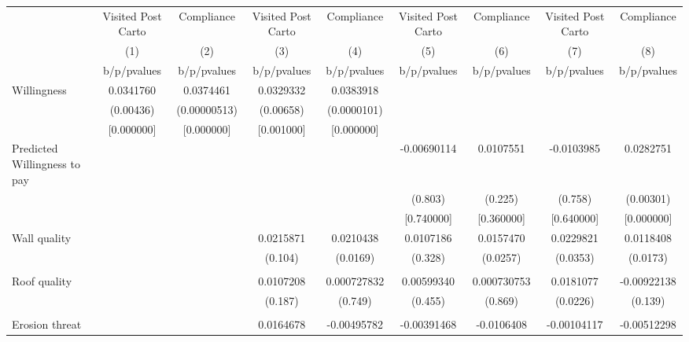 {
\def\sym#1{\ifmmode^{#1}\else\(^{#1}\)\fi}
\begin{tabular}{l*{8}{c}}
\toprule
                &\multicolumn{1}{c}{Visited Post Carto}&\multicolumn{1}{c}{Compliance}&\multicolumn{1}{c}{Visited Post Carto}&\multicolumn{1}{c}{Compliance}&\multicolumn{1}{c}{Visited Post Carto}&\multicolumn{1}{c}{Compliance}&\multicolumn{1}{c}{Visited Post Carto}&\multicolumn{1}{c}{Compliance}\\
                &\multicolumn{1}{c}{(1)}&\multicolumn{1}{c}{(2)}&\multicolumn{1}{c}{(3)}&\multicolumn{1}{c}{(4)}&\multicolumn{1}{c}{(5)}&\multicolumn{1}{c}{(6)}&\multicolumn{1}{c}{(7)}&\multicolumn{1}{c}{(8)}\\
                &b/p/pvalues&b/p/pvalues&b/p/pvalues&b/p/pvalues&b/p/pvalues&b/p/pvalues&b/p/pvalues&b/p/pvalues\\
\midrule
Willingness     &0.0341760&0.0374461&0.0329332&0.0383918&         &         &         &         \\
                &(0.00436)&(0.00000513)&(0.00658)&(0.0000101)&         &         &         &         \\
                &[0.000000]&[0.000000]&[0.001000]&[0.000000]&         &         &         &         \\
Predicted Willingness to pay&         &         &         &         &-0.00690114&0.0107551&-0.0103985&0.0282751\\
                &         &         &         &         &  (0.803)&  (0.225)&  (0.758)&(0.00301)\\
                &         &         &         &         &[0.740000]&[0.360000]&[0.640000]&[0.000000]\\
Wall quality    &         &         &0.0215871&0.0210438&0.0107186&0.0157470&0.0229821&0.0118408\\
                &         &         &  (0.104)& (0.0169)&  (0.328)& (0.0257)& (0.0353)& (0.0173)\\
                &         &         &         &         &         &         &         &         \\
Roof quality    &         &         &0.0107208&0.000727832&0.00599340&0.000730753&0.0181077&-0.00922138\\
                &         &         &  (0.187)&  (0.749)&  (0.455)&  (0.869)& (0.0226)&  (0.139)\\
                &         &         &         &         &         &         &         &         \\
Erosion threat  &         &         &0.0164678&-0.00495782&-0.00391468&-0.0106408&-0.00104117&-0.00512298\\

\end{tabular}}
